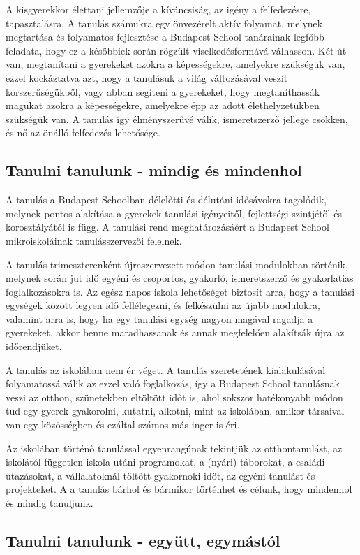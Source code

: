 A kisgyerekkor élettani jellemzője a kíváncsiság, az igény a felfedezésre,
tapasztalásra. A tanulás számukra egy önvezérelt aktív folyamat, melynek
megtartása és folyamatos fejlesztése a Budapest School tanárainak legfőbb
feladata, hogy ez a későbbiek során rögzült viselkedésformává válhasson. Két út
van, megtanítani a gyerekeket azokra a képességekre, amelyekre szükségük van,
ezzel kockáztatva azt, hogy a tanulásuk a világ változásával veszít
korszerűségükből, vagy abban segíteni a gyerekeket, hogy megtaníthassák magukat
azokra a képességekre, amelyekre épp az adott élethelyzetükben szükségük van. A
tanulás így élményszerűvé válik, ismeretszerző jellege csökken, és nő az önálló
felfedezés lehetősége.

\subsection{Tanulni tanulunk - mindig és mindenhol}
A tanulás a Budapest Schoolban délelőtti és délutáni idősávokra tagolódik,
melynek pontos alakítása a gyerekek tanulási igényeitől, fejlettségi szintjétől
és korosztályától is függ. A tanulási rend meghatározásáért a Budapest School
mikroiskoláinak tanulásszervezői felelnek.

A tanulás trimeszterenként újraszervezett módon tanulási modulokban történik,
melynek során jut idő egyéni és csoportos, gyakorló, ismeretszerző és
gyakorlatias foglalkozásokra is. Az egész napos iskola lehetőséget biztosít
arra, hogy a tanulási egységek között legyen idő fellélegezni, és felkészülni
az újabb modulokra, valamint arra is, hogy ha egy tanulási egység nagyon
magával ragadja a gyerekeket, akkor benne maradhassanak és annak megfelelően
alakítsák újra az időrendjüket.

A tanulás az iskolában nem ér véget. A tanulás
szeretetének kialakulásával folyamatossá válik az ezzel való foglalkozás, így a
Budapest School tanulásnak veszi az otthon, szünetekben eltöltött időt is, ahol
sokszor hatékonyabb módon tud egy gyerek gyakorolni, kutatni, alkotni, mint az
iskolában, amikor
társaival van egy közösségben és ezáltal számos más inger is éri.

Az iskolában történő tanulással egyenrangúnak tekintjük az otthontanulást, az
iskolától független iskola utáni programokat, a (nyári) táborokat, a családi
utazásokat, a
vállalatoknál töltött gyakornoki időt, az egyéni tanulást és projekteket. A
a tanulás bárhol és bármikor történhet és célunk, hogy mindenhol és mindig
tanuljunk.

\subsection{Tanulni tanulunk - együtt, egymástól}

